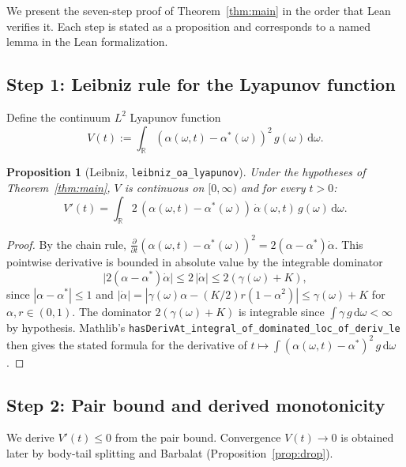 \documentclass[11pt,a4paper]{article}
\newtheorem{proposition}[theorem]{Proposition}
\theoremstyle{definition}
\newcommand{\R}{\mathbb{R}}
\begin{document}
We present the seven-step proof of Theorem~\ref{thm:main} in the order that Lean verifies it. Each step is stated as a proposition and corresponds to a named lemma in the Lean formalization.

\subsection{Step 1: Leibniz rule for the Lyapunov function}\label{sec:leibniz}

Define the continuum $L^2$ Lyapunov function
\begin{equation}\label{eq:V}
V(t) := \int_\R (\alpha(\omega,t) - \alpha^*(\omega))^2\,g(\omega)\,\mathrm{d}\omega.
\end{equation}

\begin{proposition}[Leibniz, \texttt{leibniz\_oa\_lyapunov}]\label{prop:leibniz}
Under the hypotheses of Theorem~\ref{thm:main}, $V$ is continuous on $[0,\infty)$ and for every $t > 0$:
\[
V'(t) = \int_\R 2\,(\alpha(\omega,t) - \alpha^*(\omega))\,\dot{\alpha}(\omega,t)\,g(\omega)\,\mathrm{d}\omega.
\]
\end{proposition}

\begin{proof}
By the chain rule, $\frac{\partial}{\partial t}(\alpha(\omega,t) - \alpha^*(\omega))^2 = 2(\alpha - \alpha^*)\dot{\alpha}$. This pointwise derivative is bounded in absolute value by the integrable dominator
\[
\bigl|2(\alpha - \alpha^*)\dot{\alpha}\bigr| \leq 2\,|\dot{\alpha}| \leq 2(\gamma(\omega) + K),
\]
since $|\alpha - \alpha^*| \leq 1$ and $|\dot{\alpha}| = |\gamma(\omega)\alpha - (K/2)r(1-\alpha^2)| \leq \gamma(\omega) + K$ for $\alpha, r \in (0,1)$. The dominator $2(\gamma(\omega) + K)$ is integrable since $\int \gamma\,g\,\mathrm{d}\omega < \infty$ by hypothesis. Mathlib's \texttt{hasDerivAt\_integral\_of\_dominated\_loc\_of\_deriv\_le} then gives the stated formula for the derivative of $t \mapsto \int (\alpha(\omega,t) - \alpha^*)^2\,g\,\mathrm{d}\omega$.
\end{proof}

\subsection{Step 2: Pair bound and derived monotonicity}\label{sec:pair}

We derive $V'(t) \leq 0$ from the pair bound. Convergence $V(t) \to 0$ is obtained later by body-tail splitting and Barbalat (Proposition~\ref{prop:drop}).
\end{document}
